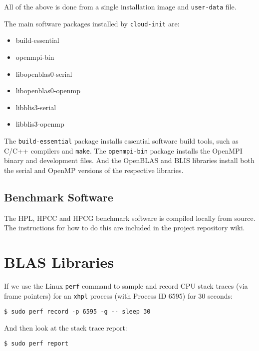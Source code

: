 All of the above is done from a single installation image and \verb|user-data| file.

The main software packages installed by \verb|cloud-init| are:

\begin{itemize}
\item build-essential
\item openmpi-bin
\item libopenblas0-serial
\item libopenblas0-openmp
\item libblis3-serial
\item libblis3-openmp
\end{itemize}

The \verb|build-essential| package installs essential software build tools, such as C/C++ compilers and \verb|make|. The \verb|openmpi-bin| package installs the OpenMPI binary and development files. And the OpenBLAS and BLIS libraries install both the serial and OpenMP versions of the respective libraries. 


%
%
\subsection{Benchmark Software}

The HPL, HPCC and HPCG benchmark software is compiled locally from source. The instructions for how to do this are included in the project repository wiki.


%
%
\section{BLAS Libraries}

If we use the Linux \verb|perf| command to sample and record CPU stack traces (via frame pointers) for an \verb|xhpl| process (with Process ID 6595) for 30 seconds:

\lstset{style=type}
\begin{lstlisting}
$ sudo perf record -p 6595 -g -- sleep 30
\end{lstlisting}

And then look at the stack trace report: 

\lstset{style=type}
\begin{lstlisting}
$ sudo perf report
\end{lstlisting}

